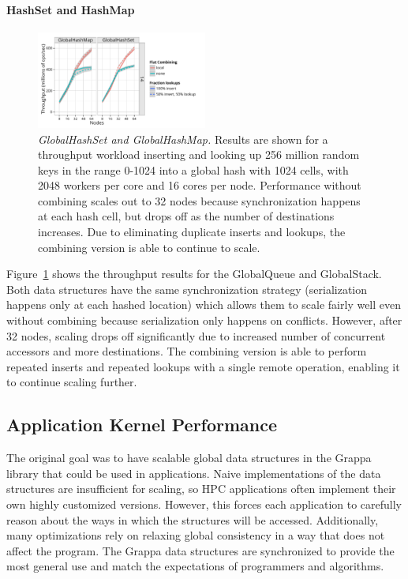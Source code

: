 \paragraph{HashSet and HashMap}
\begin{figure}[t]
  \centering
  \includegraphics[width=0.5\textwidth]{data/plots/hash_perf.pdf}
  \caption{\emph{GlobalHashSet and GlobalHashMap.}
    Results are shown for a throughput workload inserting and looking up 256 million random keys in the range 0-1024 into a global hash with 1024 cells, with 2048 workers per core and 16 cores per node.
    Performance without combining scales out to 32 nodes because synchronization happens at each hash cell, but drops off as the number of destinations increases. Due to eliminating duplicate inserts and lookups, the combining version is able to continue to scale.}
  \label{fig:hash_perf}
\end{figure}

Figure~\ref{fig:hash_perf} shows the throughput results for the GlobalQueue and GlobalStack.
Both data structures have the same synchronization strategy (serialization happens only at each hashed location) which allows them to scale fairly well even without combining because serialization only happens on conflicts. However, after 32 nodes, scaling drops off significantly due to increased number of concurrent accessors and more destinations.
The combining version is able to perform repeated inserts and repeated lookups with a single remote operation, enabling it to continue scaling further.

\subsection{Application Kernel Performance}
The original goal was to have scalable global data structures in the Grappa library that could be used in applications. Naive implementations of the data structures are insufficient for scaling, so HPC applications often implement their own highly customized versions. However, this forces each application to carefully reason about the ways in which the structures will be accessed. Additionally, many optimizations rely on relaxing global consistency in a way that does not affect the program. 
The Grappa data structures are synchronized to provide the most general use and match the expectations of programmers and algorithms.

